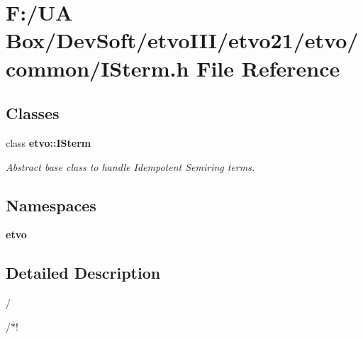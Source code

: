 \section{F\+:/\+UA Box/\+Dev\+Soft/etvo\+I\+I\+I/etvo21/etvo/common/\+I\+Sterm.h File Reference}
\label{_i_sterm_8h}
\subsection*{Classes}
\begin{DoxyCompactItemize}
\item 
class \textbf{ etvo\+::\+I\+Sterm}
\begin{DoxyCompactList}\small\item\em Abstract base class to handle Idempotent Semiring terms. \end{DoxyCompactList}\end{DoxyCompactItemize}
\subsection*{Namespaces}
\begin{DoxyCompactItemize}
\item 
 \textbf{ etvo}
\end{DoxyCompactItemize}


\subsection{Detailed Description}
/

/$\ast$! 